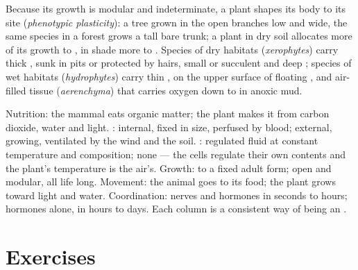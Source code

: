 \begin{proposition}\label{prop:b1:flowering-plant-organization:plasticity}
Because its growth is modular and indeterminate, a plant shapes its
body to its site (\emph{phenotypic plasticity}): a tree grown in the open branches low and wide, the same
species in a forest grows a tall bare trunk; a plant in dry soil
allocates more of its growth to , in shade more to . Species
of dry habitats (\emph{xerophytes}) carry thick
,  sunk in pits or protected by hairs, small or
succulent  and deep ; species of wet habitats
(\emph{hydrophytes}) carry thin ,  on
the upper surface of floating , and air-filled tissue
(\emph{aerenchyma}) that carries oxygen down to 
in anoxic mud.
\end{proposition}

\begin{example}\label{ex:b1:flowering-plant-organization:comparison}
Nutrition: the mammal eats organic matter; the plant makes it from
carbon dioxide, water and light. : internal, fixed in
size, perfused by blood; external, growing, ventilated by the wind and
the soil. : regulated fluid at constant temperature
and composition; none --- the cells regulate their own contents and the
plant's temperature is the air's. Growth: to a fixed adult form; open
and modular, all life long. Movement: the animal goes to its food; the
plant grows toward light and water. Coordination: nerves and hormones
in seconds to hours; hormones alone, in hours to days. Each column is a
consistent way of being an .
\end{example}

\section{Exercises}

